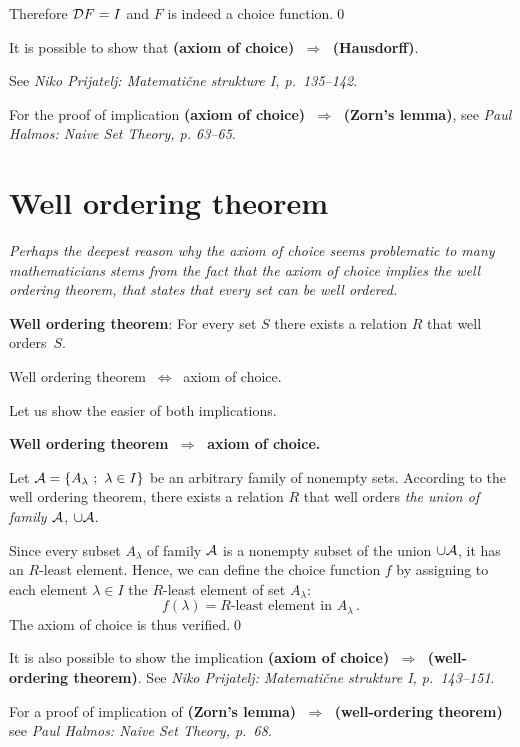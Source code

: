 \documentclass[11pt,paper=b5,footinclude,headinclude]{scrbook} %
\def\sledi {{~\Rightarrow~}}
\def\cee {{~\Leftrightarrow~}}
\theoremstyle{remark}
\theoremstyle{definition} %
\theoremstyle{theorem} %
\begin{document}
Therefore ${\cal D}F = I$ and $F$ is indeed a choice function.\qed

\bigskip

It is possible to show that \textbf{ (axiom of choice) $\sledi$ (Hausdorff)}.

See \emph{ Niko Prijatelj: Matemati\v cne strukture I, p.~135--142}.

For the proof of implication \textbf{ (axiom of choice) $\sledi$ (Zorn's lemma)},
see \emph{ Paul Halmos: Naive Set Theory, p. 63--65}.

\section{Well ordering theorem}

\emph{ Perhaps the deepest reason why the axiom of choice seems problematic to many mathematicians stems from the fact that
the axiom of choice implies the well ordering theorem, that states that every set can be well ordered.}


\medskip
\textbf{ Well ordering theorem}:
For every set $S$ there exists a relation $R$ that well orders~$S$.

\bigskip
Well ordering theorem $\cee$ axiom of choice.

\bigskip
Let us show the easier of both implications.

\textbf{ Well ordering theorem $\sledi$ axiom of choice.}

Let ${\cal A} = \{A_\lambda~;~\lambda\in I\}$ be an arbitrary family of nonempty sets.
According to the well ordering theorem, there exists a relation  $R$ that well orders \emph{ the union of family ${\cal A}$}, $\cup {\cal A}$.

Since every subset $A_\lambda$ of family ${\cal A}$ is a nonempty subset of the union
$\cup{\cal A}$, it has an $R$-least element.
Hence, we can define the choice function $f$ by assigning to each element $\lambda\in I$ the
$R$-least element of set  $A_\lambda$:
$$f(\lambda) = R\textrm{-least element in  }A_\lambda\,.$$
The axiom of choice is thus verified.\qed

It is also possible to show the implication \textbf{ (axiom of choice) $\sledi$ (well-ordering theorem)}.
See \emph{ Niko Prijatelj: Matemati\v cne strukture I, p.~143--151}.

For a proof of implication of \textbf{ (Zorn's lemma) $\sledi$ (well-ordering theorem)}
see \emph{ Paul Halmos: Naive Set Theory, p.~68}.
\end{document}
